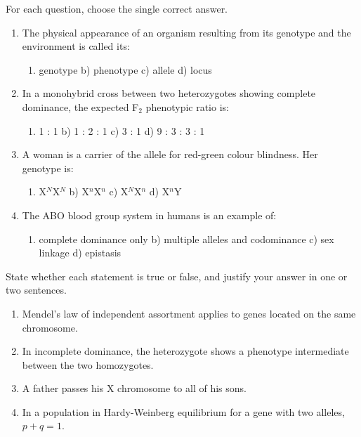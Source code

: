 \documentclass[11pt]{article}
\begin{document}
\begin{exercice}
For each question, choose the single correct answer.
\begin{enumerate}
\item The physical appearance of an organism resulting from its genotype and the environment is called its:
\begin{enumerate}
\item genotype \quad b) phenotype \quad c) allele \quad d) locus
\end{enumerate}
\item In a monohybrid cross between two heterozygotes showing complete dominance, the expected F$_2$ phenotypic ratio is:
\begin{enumerate}
\item 1 : 1 \quad b) 1 : 2 : 1 \quad c) 3 : 1 \quad d) 9 : 3 : 3 : 1
\end{enumerate}
\item A woman is a carrier of the allele for red-green colour blindness. Her genotype is:
\begin{enumerate}
\item X$^N$X$^N$ \quad b) X$^n$X$^n$ \quad c) X$^N$X$^n$ \quad d) X$^n$Y
\end{enumerate}
\item The ABO blood group system in humans is an example of:
\begin{enumerate}
\item complete dominance only \quad b) multiple alleles and codominance \quad c) sex linkage \quad d) epistasis
\end{enumerate}
\end{enumerate}
\end{exercice}

\begin{exercice}
State whether each statement is true or false, and justify your answer in one or two sentences.
\begin{enumerate}
\item Mendel's law of independent assortment applies to genes located on the same chromosome.
\item In incomplete dominance, the heterozygote shows a phenotype intermediate between the two homozygotes.
\item A father passes his X chromosome to all of his sons.
\item In a population in Hardy-Weinberg equilibrium for a gene with two alleles, $p + q = 1$.
\end{enumerate}
\end{exercice}
\end{document}
